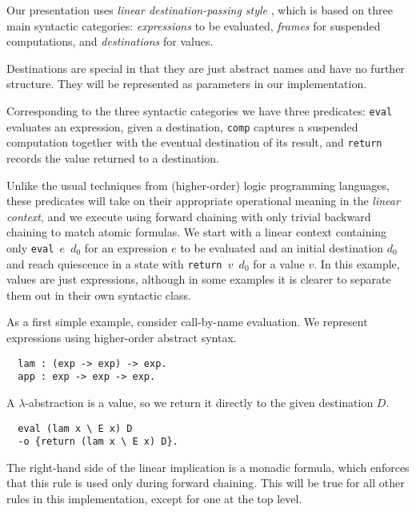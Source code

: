 \documentclass{sig-alt}
\begin{document}
Our presentation uses \emph{linear des\-ti\-na\-tion-pass\-ing
style} \cite{Pfenning04aplas}, which is based on three main syntactic
categories: \emph{expressions} to be evaluated, \emph{frames} for
suspended computations, and \emph{destinations} for values.

Destinations are special in that they are just
abstract names and have no further structure.  They will
be represented as parameters in our implementation.

Corresponding to the three syntactic categories we have three
predicates: \texttt{eval} evaluates an expression, given a destination,
\texttt{comp} captures a suspended computation together with the
eventual destination of its result, and \texttt{return} records the
value returned to a destination.

Unlike the usual techniques from (higher-order) logic programming
languages, these predicates will take on their appropriate operational
meaning in the \emph{linear context}, and we execute using
forward chaining with only trivial backward chaining to match atomic
formulas.  We start with a linear context containing only
\texttt{eval $e$ $d_0$}
for an expression $e$ to be evaluated and an initial destination $d_0$
and reach quiescence in a state with
\texttt{return $v$ $d_0$}
for a value $v$.  In this example, values are just expressions, although
in some examples it is clearer to separate them out in their own
syntactic class.

As a first simple example, consider call-by-name evaluation.
We represent expressions using higher-order abstract syntax.

\begin{small}\begin{verbatim}
  lam : (exp -> exp) -> exp.
  app : exp -> exp -> exp.
\end{verbatim}\end{small}

A $\lambda$-abstraction is a value, so we return it directly
to the given destination $D$.

\begin{small}\begin{verbatim}
  eval (lam x \ E x) D
  -o {return (lam x \ E x) D}. 
\end{verbatim}\end{small}
\noindent The right-hand side of the linear implication is a monadic formula,
which enforces that this rule is used only during forward chaining.
This will be true for all other rules in this implementation,
except for one at the top level.
\end{document}

